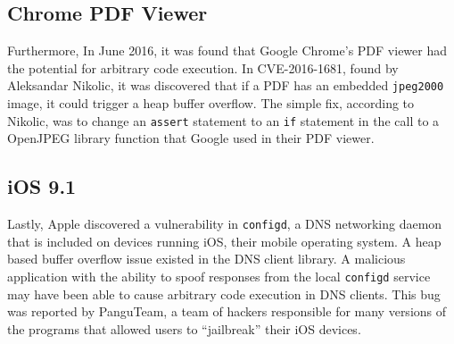 \subsection{Chrome PDF Viewer}

Furthermore, In June 2016, it was found that Google Chrome's PDF viewer had the potential for arbitrary code execution. In CVE-2016-1681, found by Aleksandar Nikolic, it was discovered that if a PDF has an embedded \texttt{jpeg2000} image, it could trigger a heap buffer overflow. The simple fix, according to Nikolic, was to change an \texttt{assert} statement to an \texttt{if} statement in the call to a OpenJPEG library function that Google used in their PDF viewer. \cite{chrome_pdf_2016}

\subsection{iOS 9.1}

Lastly, Apple discovered a vulnerability in \texttt{configd}, a DNS networking daemon that is included on devices running iOS, their mobile operating system. A heap based buffer overflow issue existed in the DNS client library. A malicious application with the ability to spoof responses from the local \texttt{configd} service may have been able to cause arbitrary code execution in DNS clients. This bug was reported by PanguTeam, a team of hackers responsible for many versions of the programs that allowed users to “jailbreak” their iOS devices. \cite{apple_ios_2016}
